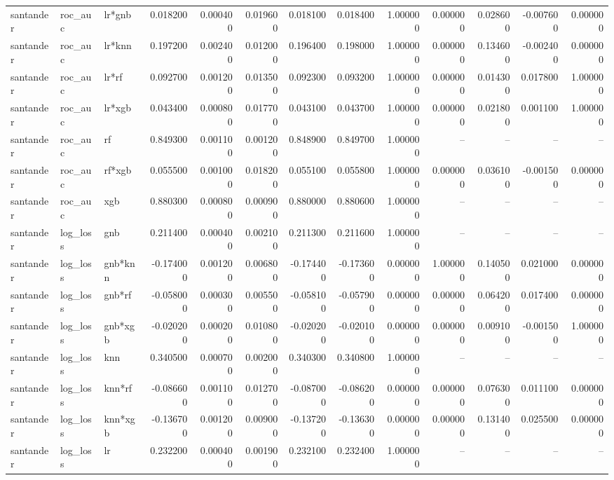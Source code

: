 \begin{landscape}
\begin{longtable}{lllrrrrrrrrrr}
santander & roc\_auc & lr*gnb & 0.018200 & 0.000400 & 0.019600 & 0.018100 & 0.018400 & 1.000000 & 0.000000 & 0.028600 & -0.007600 & 0.000000 \\
santander & roc\_auc & lr*knn & 0.197200 & 0.002400 & 0.012000 & 0.196400 & 0.198000 & 1.000000 & 0.000000 & 0.134600 & -0.002400 & 0.000000 \\
santander & roc\_auc & lr*rf & 0.092700 & 0.001200 & 0.013500 & 0.092300 & 0.093200 & 1.000000 & 0.000000 & 0.014300 & 0.017800 & 1.000000 \\
santander & roc\_auc & lr*xgb & 0.043400 & 0.000800 & 0.017700 & 0.043100 & 0.043700 & 1.000000 & 0.000000 & 0.021800 & 0.001100 & 1.000000 \\
santander & roc\_auc & rf & 0.849300 & 0.001100 & 0.001200 & 0.848900 & 0.849700 & 1.000000 & -- & -- & -- & -- \\
santander & roc\_auc & rf*xgb & 0.055500 & 0.001000 & 0.018200 & 0.055100 & 0.055800 & 1.000000 & 0.000000 & 0.036100 & -0.001500 & 0.000000 \\
santander & roc\_auc & xgb & 0.880300 & 0.000800 & 0.000900 & 0.880000 & 0.880600 & 1.000000 & -- & -- & -- & -- \\
santander & log\_loss & gnb & 0.211400 & 0.000400 & 0.002100 & 0.211300 & 0.211600 & 1.000000 & -- & -- & -- & -- \\
santander & log\_loss & gnb*knn & -0.174000 & 0.001200 & 0.006800 & -0.174400 & -0.173600 & 0.000000 & 1.000000 & 0.140500 & 0.021000 & 0.000000 \\
santander & log\_loss & gnb*rf & -0.058000 & 0.000300 & 0.005500 & -0.058100 & -0.057900 & 0.000000 & 0.000000 & 0.064200 & 0.017400 & 0.000000 \\
santander & log\_loss & gnb*xgb & -0.020200 & 0.000200 & 0.010800 & -0.020200 & -0.020100 & 0.000000 & 0.000000 & 0.009100 & -0.001500 & 1.000000 \\
santander & log\_loss & knn & 0.340500 & 0.000700 & 0.002000 & 0.340300 & 0.340800 & 1.000000 & -- & -- & -- & -- \\
santander & log\_loss & knn*rf & -0.086600 & 0.001100 & 0.012700 & -0.087000 & -0.086200 & 0.000000 & 0.000000 & 0.076300 & 0.011100 & 0.000000 \\
santander & log\_loss & knn*xgb & -0.136700 & 0.001200 & 0.009000 & -0.137200 & -0.136300 & 0.000000 & 0.000000 & 0.131400 & 0.025500 & 0.000000 \\
santander & log\_loss & lr & 0.232200 & 0.000400 & 0.001900 & 0.232100 & 0.232400 & 1.000000 & -- & -- & -- & -- \\

\end{longtable}
\end{landscape}
